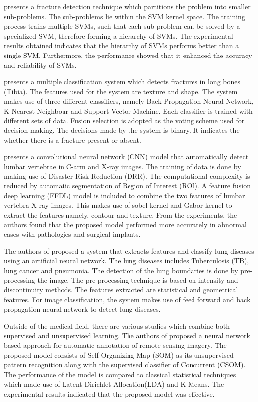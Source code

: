 \documentclass[11pt,twocolumn]{witseiepaper}
\begin{document}
	\cite{JoshuaCongfuHe2007} presents a fracture detection technique which partitions the problem into smaller sub-problems. The sub-problems lie within the SVM kernel space. The training process trains multiple SVMs, such that each sub-problem can be solved by a specialized SVM, therefore forming a hierarchy of SVMs. The experimental results obtained indicates that the hierarchy of SVMs performs better than a single SVM. Furthermore, the performance showed that it enhanced the accuracy and reliability of SVMs.
	
	\cite{multiple_classification} presents a multiple classification system which detects fractures in long bones (Tibia). The features used for the system are texture and shape. The system makes use of three different classifiers, namely Back Propagation Neural Network, K-Nearest Neighbour and Support Vector Machine. Each classifier is trained with different sets of data. Fusion selection is adopted as the voting scheme used for decision making. The decisions made by the system is binary. It indicates the whether there is a fracture present or absent.
	
	\cite{Li_Liang2016} presents a convolutional neural network (CNN) model that automatically detect lumbar vertebrae in C-arm and X-ray images. The training of data is done by making use of Disaster Risk Reduction (DRR). The computational complexity is reduced by automatic segmentation of Region of Interest (ROI). A feature fusion deep learning (FFDL) model is included to combine the two features of lumbar vertebra X-ray images. This makes use of sobel kernel and Gabor kernel to extract the features namely, contour and texture. From the experiments, the authors found that the proposed model performed more accurately in abnormal cases with pathologies and surgical implants. 
	
	The authors of \cite{Pune2016} proposed a system that extracts features and classify lung diseases using an artificial neural network. The lung diseases includes Tuberculosis (TB), lung cancer and pneumonia. The detection of the lung boundaries is done by pre-processing the image. The pre-processing technique is based on intensity and discontinuity methods. The features extracted are statistical and geometrical features. For image classification, the system makes use of feed forward and back propagation neural network to detect lung diseases. 
	
	Outside of the medical field, there are various studies which combine both supervised and unsupervised learning. The authors of \cite{neagoe_new_2014} proposed a neural network based approach for automatic annotation of remote sensing imagery. The proposed model consists of Self-Organizing Map (SOM) as its unsupervised pattern recognition along with the supervised classifier of Concurrent (CSOM). The performance of the model is compared to classical statistical techniques which made use of Latent Dirichlet Allocation(LDA) and K-Means. The experimental results indicated that the proposed model was effective.
	
\end{document}
